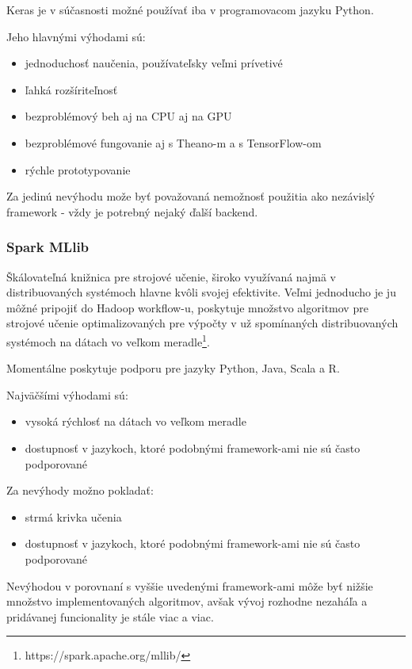 Keras je v súčasnosti možné používať iba v programovacom jazyku Python.

Jeho hlavnými výhodami sú:
\begin{itemize}
	\item jednoduchosť naučenia, používateľsky veľmi prívetivé
	\item ľahká rozšíriteľnosť
	\item bezproblémový beh aj na CPU aj na GPU
	\item bezproblémové fungovanie aj s Theano-m a s TensorFlow-om
	\item rýchle prototypovanie
\end{itemize}

Za jedinú nevýhodu može byť považovaná nemožnosť použitia ako nezávislý framework - vždy je potrebný nejaký ďalší backend.

\subsubsection{Spark MLlib}

Škálovateľná knižnica pre strojové učenie, široko využívaná najmä v distribuovaných systémoch hlavne kvôli svojej efektivite. Veľmi jednoducho je ju môžné pripojiť do Hadoop workflow-u, poskytuje množstvo algoritmov pre strojové učenie optimalizovaných pre výpočty v už spomínaných distribuovaných systémoch na dátach vo veľkom meradle\footnote{https://spark.apache.org/mllib/}.

Momentálne poskytuje podporu pre jazyky Python, Java, Scala a R.

Najväčšími výhodami sú:
\begin{itemize}
	\item vysoká rýchlosť na dátach vo veľkom meradle
	\item dostupnosť v jazykoch, ktoré podobnými framework-ami nie sú často podporované
\end{itemize}

Za nevýhody možno pokladať:
\begin{itemize}
	\item strmá krivka učenia
	\item dostupnosť v jazykoch, ktoré podobnými framework-ami nie sú často podporované
\end{itemize}

Nevýhodou v porovnaní s vyššie uvedenými framework-ami môže byť nižšie množstvo implementovaných algoritmov, avšak vývoj rozhodne nezaháľa a pridávanej funcionality je stále viac a viac.

